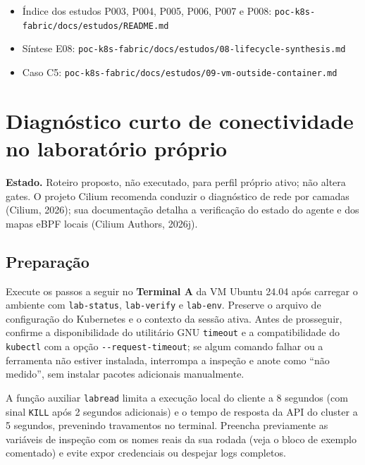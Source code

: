 \documentclass[12pt,openany,oneside,a4paper,chapter=TITLE,english,brazil]{abntex2}
\begin{document}
\begin{apendicesenv}
\begin{itemize}
\item
  Índice dos estudos P003, P004, P005, P006, P007 e P008: \texttt{poc-{}\allowbreak{}k8s-{}\allowbreak{}fabric/\allowbreak{}docs/\allowbreak{}estudos/\allowbreak{}README.\allowbreak{}md}
\item
  Síntese E08: \texttt{poc-{}\allowbreak{}k8s-{}\allowbreak{}fabric/\allowbreak{}docs/\allowbreak{}estudos/\allowbreak{}08-{}\allowbreak{}lifecycle-{}\allowbreak{}synthesis.\allowbreak{}md}
\item
  Caso C5: \texttt{poc-{}\allowbreak{}k8s-{}\allowbreak{}fabric/\allowbreak{}docs/\allowbreak{}estudos/\allowbreak{}09-{}\allowbreak{}vm-{}\allowbreak{}outside-{}\allowbreak{}container.\allowbreak{}md}
\end{itemize}

\chapter{Diagnóstico curto de conectividade no laboratório próprio}\label{diagnuxf3stico-curto-de-conectividade-no-laboratuxf3rio-pruxf3prio}

\textbf{Estado.} Roteiro proposto, não executado, para perfil próprio ativo; não altera gates. O projeto Cilium recomenda conduzir o diagnóstico de rede por camadas (Cilium, 2026); sua documentação detalha a verificação do estado do agente e dos mapas eBPF locais (Cilium Authors, 2026j).

\section*{Preparação}\label{preparauxe7uxe3o}

Execute os passos a seguir no \textbf{Terminal A} da VM Ubuntu 24.04 após carregar o ambiente com \texttt{lab-{}\allowbreak{}status}, \texttt{lab-{}\allowbreak{}verify} e \texttt{lab-{}\allowbreak{}env}. Preserve o arquivo de configuração do Kubernetes e o contexto da sessão ativa. Antes de prosseguir, confirme a disponibilidade do utilitário GNU \texttt{timeout} e a compatibilidade do \texttt{kubectl} com a opção \texttt{-{}\allowbreak{}-{}\allowbreak{}request-{}\allowbreak{}timeout}; se algum comando falhar ou a ferramenta não estiver instalada, interrompa a inspeção e anote como ``não medido'', sem instalar pacotes adicionais manualmente.

A função auxiliar \texttt{labread} limita a execução local do cliente a 8 segundos (com sinal \texttt{KILL} após 2 segundos adicionais) e o tempo de resposta da API do cluster a 5 segundos, prevenindo travamentos no terminal. Preencha previamente as variáveis de inspeção com os nomes reais da sua rodada (veja o bloco de exemplo comentado) e evite expor credenciais ou despejar logs completos.


\end{apendicesenv}
\end{document}
